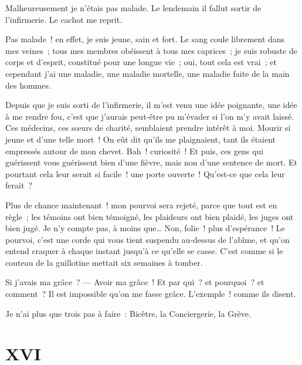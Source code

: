 \documentclass[french,twoside]{book} %
\begin{document}
\noindent Malheureusement je n’étais pas malade. Le lendemain il fallut sortir de l’infirmerie. Le cachot me reprit.\par
Pas malade ! en effet, je suis jeune, sain et fort. Le sang coule librement dans mes veines ; tous mes membres obéissent à tous mes caprices ; je suis robuste de corps et d’esprit, constitué pour une longue vie ; oui, tout cela est vrai ; et cependant j’ai une maladie, une maladie mortelle, une maladie faite de la main des hommes.\par
Depuis que je suis sorti de l’infirmerie, il m’est venu une idée poignante, une idée à me rendre fou, c’est que j’aurais peut-être pu m’évader si l’on m’y avait laissé. Ces médecins, ces sœurs de charité, semblaient prendre intérêt à moi. Mourir si jeune et d’une telle mort ! On eût dit qu’ils me plaignaient, tant ils étaient empressés autour de mon chevet. Bah ! curiosité ! Et puis, ces gens qui guérissent vous guérissent bien d’une fièvre, mais non d’une sentence de mort. Et pourtant cela leur serait si facile ! une porte ouverte ! Qu’est-ce que cela leur ferait ?\par
 Plus de chance maintenant ! mon pourvoi sera rejeté, parce que tout est en règle ; les témoins ont bien témoigné, les plaideurs ont bien plaidé, les juges ont bien jugé. Je n’y compte pas, à moins que… Non, folie ! plus d’espérance ! Le pourvoi, c’est une corde qui vous tient suspendu au-dessus de l’abîme, et qu’on entend craquer à chaque instant jusqu’à ce qu’elle se casse. C’est comme si le couteau de la guillotine mettait six semaines à tomber.\par
Si j’avais ma grâce ? — Avoir ma grâce ! Et par qui ? et pourquoi ? et comment ? Il est impossible qu’on me fasse grâce. L’exemple ! comme ils disent.\par
Je n’ai plus que trois pas à faire : Bicêtre, la Conciergerie, la Grève.
 \section[{XVI}]{XVI}
\label{ch16}\renewcommand{\leftmark}{XVI}
\end{document}
